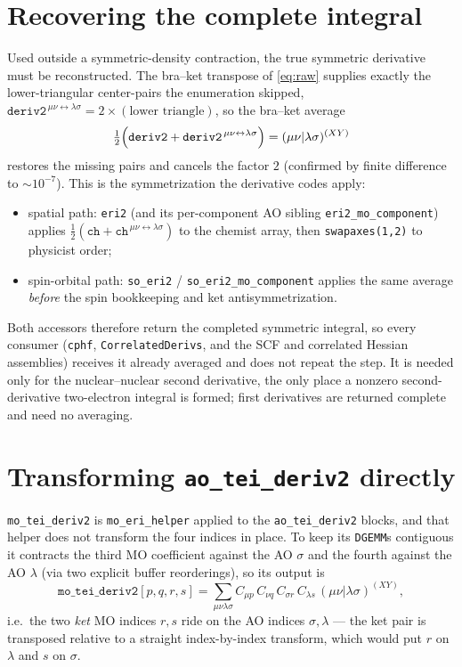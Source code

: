\documentclass[11pt]{article}
\begin{document}
\section{Recovering the complete integral}

Used outside a symmetric-density contraction, the true symmetric derivative must
be reconstructed. The bra--ket transpose of \eqref{eq:raw} supplies exactly the
lower-triangular center-pairs the enumeration skipped,
$\texttt{deriv2}^{\,\mu\nu\leftrightarrow\lambda\sigma}=2\times(\text{lower
triangle})$, so the bra--ket average
%
\begin{equation}
\tfrac12\Bigl(\texttt{deriv2}
   + \texttt{deriv2}^{\,\mu\nu\leftrightarrow\lambda\sigma}\Bigr)
= (\mu\nu|\lambda\sigma)^{(XY)}
\label{eq:avg}
\end{equation}
%
restores the missing pairs and cancels the factor $2$ (confirmed by finite
difference to $\sim\!10^{-7}$). This is the symmetrization the derivative codes
apply:
%
\begin{itemize}
\item spatial path: \texttt{eri2} (and its per-component AO sibling
\texttt{eri2\_mo\_component}) applies
$\tfrac12(\texttt{ch}+\texttt{ch}^{\,\mu\nu\leftrightarrow\lambda\sigma})$ to the
chemist array, then \texttt{swapaxes(1,2)} to physicist order;
\item spin-orbital path: \texttt{so\_eri2} / \texttt{so\_eri2\_mo\_component}
applies the same average \emph{before} the spin bookkeeping and ket
antisymmetrization.
\end{itemize}
%
Both accessors therefore return the completed symmetric integral, so every
consumer (\texttt{cphf}, \texttt{CorrelatedDerivs}, and the SCF and correlated
Hessian assemblies) receives it already averaged and does not repeat the step. It
is needed only for the nuclear--nuclear second derivative, the only place a
nonzero second-derivative two-electron integral is formed; first derivatives are
returned complete and need no averaging.

\section{Transforming \texttt{ao\_tei\_deriv2} directly}

\texttt{mo\_tei\_deriv2} is \texttt{mo\_eri\_helper} applied to the
\texttt{ao\_tei\_deriv2} blocks, and that helper does not transform the four
indices in place. To keep its \texttt{DGEMM}s contiguous it contracts the third MO
coefficient against the AO $\sigma$ and the fourth against the AO $\lambda$ (via
two explicit buffer reorderings), so its output is
%
\begin{equation}
\texttt{mo\_tei\_deriv2}[p,q,r,s]
  = \sum_{\mu\nu\lambda\sigma} C_{\mu p}\,C_{\nu q}\,C_{\sigma r}\,C_{\lambda s}\,
    (\mu\nu|\lambda\sigma)^{(XY)} ,
\label{eq:ketreorder}
\end{equation}
%
i.e.\ the two \emph{ket} MO indices $r,s$ ride on the AO indices $\sigma,\lambda$
--- the ket pair is transposed relative to a straight index-by-index transform,
which would put $r$ on $\lambda$ and $s$ on $\sigma$.
\end{document}
